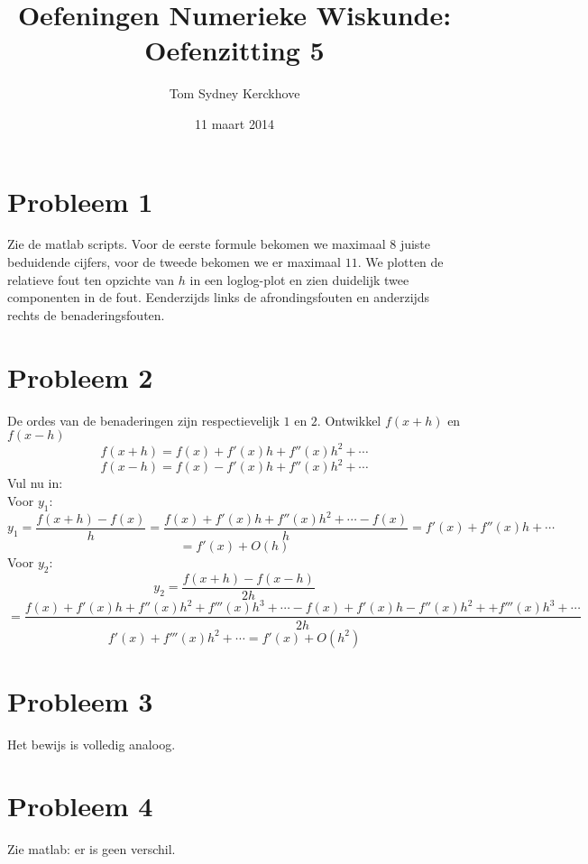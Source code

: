 \documentclass[12pt,a4paper]{article}
\author{Tom Sydney Kerckhove}
\title{Oefeningen Numerieke Wiskunde:\\ Oefenzitting 5}
\date{11 maart 2014}
\begin{document}
\maketitle

\section{Probleem 1}
Zie de matlab scripts.
Voor de eerste formule bekomen we maximaal $8$ juiste beduidende cijfers, voor de tweede bekomen we er maximaal $11$. We plotten de relatieve fout ten opzichte van $h$ in een loglog-plot en zien duidelijk twee componenten in de fout. Eenderzijds links de afrondingsfouten en anderzijds rechts de benaderingsfouten.

\section{Probleem 2}
De ordes van de benaderingen zijn respectievelijk $1$ en $2$.
Ontwikkel $f(x+h)$ en $f(x-h)$
\[
f(x+h) = f(x) + f'(x)h + f''(x)h^2 + \cdots
\]
\[
f(x-h) = f(x) - f'(x)h + f''(x)h^2 + \cdots
\]
Vul nu in:\\
Voor $y_1$:
\[
y_1 = \frac{f(x+h) - f(x)}{h} = \frac{f(x) + f'(x)h + f''(x)h^2 + \cdots - f(x)}{h} = f'(x) + f''(x)h + \cdots
\]
\[
= f'(x) + O(h) 
\]
Voor $y_2$:
\[
y_2 = \frac{f(x+h) - f(x-h)}{2h} 
\]
\[= \frac{f(x) + f'(x)h + f''(x)h^2 + f'''(x)h^3 + \cdots - f(x) + f'(x)h - f''(x)h^2 + + f'''(x)h^3 + \cdots }{2h}
\]
\[
f'(x) + f'''(x)h^2 + \cdots = f'(x) + O(h^2)
\]


\section{Probleem 3}
Het bewijs is volledig analoog.

\section{Probleem 4}
Zie matlab: er is geen verschil.
\end{document}
